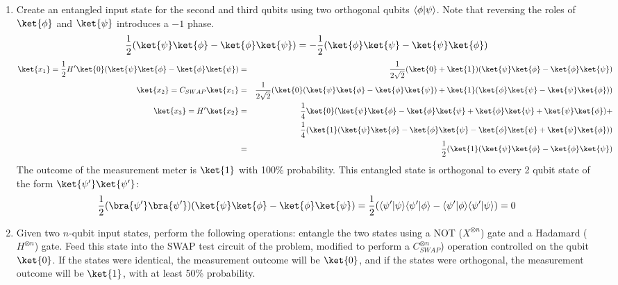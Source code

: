 \documentclass[12pt]{article}
\begin{document}
\begin{enumerate}
\item %
Create an entangled input state for the second and third qubits using
two orthogonal qubits $\langle \phi|\psi \rangle$. Note that reversing the
roles of $\ket{\phi}$ and $\ket{\psi}$ introduces a $-1$ phase.
%
\begin{displaymath}
\frac{1}{2}(\ket{\psi}\ket{\phi}-\ket{\phi}\ket{\psi}) =
-\frac{1}{2}(\ket{\phi}\ket{\psi}-\ket{\psi}\ket{\phi})
\end{displaymath}
%
\begin{eqnarray*}
\ket{x_1} = \frac{1}{2}H'
\ket{0}(\ket{\psi}\ket{\phi} - \ket{\phi}\ket{\psi}) & = & \frac{1}{2\sqrt{2}}
(\ket{0}+\ket{1})(\ket{\psi}\ket{\phi}-\ket{\phi}\ket{\psi})\\
\ket{x_2} = C_{SWAP}\ket{x_1} & = & \frac{1}{2\sqrt{2}}(\ket{0}(\ket{\psi}\ket{\phi}-\ket{\phi}\ket{\psi}) + \ket{1}(\ket{\phi}\ket{\psi}-\ket{\psi}\ket{\phi})
)\\
\ket{x_3} = H'\ket{x_2} & = &
\frac{1}{4}\ket{0}(\ket{\psi}\ket{\phi} - \ket{\phi}\ket{\psi} +
\ket{\phi}\ket{\psi} + \ket{\psi}\ket{\phi}) +\\
& & \frac{1}{4}(\ket{1}(\ket{\psi}\ket{\phi} - \ket{\phi}\ket{\psi} - \ket{\phi}\ket{\psi} + \ket{\psi}\ket{\phi}))\\
& = &
\frac{1}{2}(\ket{1}(\ket{\psi}\ket{\phi} - \ket{\phi}\ket{\psi})
\end{eqnarray*}
%
The outcome of the measurement meter is $\ket{1}$ with 100\% probability.
This entangled state is orthogonal to every 2 qubit state of the
form $\ket{\psi'}\ket{\psi'}$:
%
\begin{displaymath}
\frac{1}{2}(\bra{\psi'}\bra{\psi'})(\ket{\psi}\ket{\phi} - \ket{\phi}\ket{\psi}) = \frac{1}{2}(\braket{\psi'}{\psi}\braket{\psi'}{\phi} - \braket{\psi'}{\phi}\braket{\psi'}{\psi}) = 0
\end{displaymath}

\item %
Given two $n$-qubit input states, perform the following operations:
entangle the two states using a NOT ($X^{\otimes n}$) gate and a Hadamard
($H^{\otimes n}$) gate. Feed this state into the SWAP test circuit of the
problem, modified to perform a $C_{SWAP}^{\otimes n}$) operation controlled
on the qubit $\ket{0}$.
If the states were identical, the measurement outcome will be $\ket{0}$,
and if the states were orthogonal, the measurement outcome will be
$\ket{1}$, with at least 50\% probability.
\end{enumerate}
\end{document}
